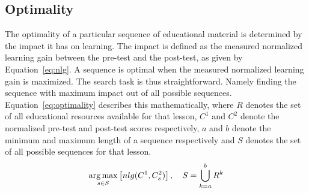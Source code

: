 \subsection{Optimality}
The optimality of a particular sequence of educational material is determined by
the impact it has on learning. The impact is defined as the measured normalized
learning gain between the pre-test and the post-test, as given by
Equation~\eqref{eq:nlg}. A sequence is optimal when the measured normalized
learning gain is maximized. The search task is thus straightforward. Namely
finding the sequence with maximum impact out of all possible sequences.
Equation~\eqref{eq:optimality} describes this mathematically, where $R$
denotes the set of all educational resources available for that lesson, $C^1$
and $C^2$ denote the normalized pre-test and post-test scores respectively, $a$
and $b$ denote the minimum and maximum length of a sequence respectively and
$S$ denotes the set of all possible sequences for that lesson.
\begin{equation}
	\label{eq:optimality}
	\operatorname*{arg\,max}_{s \in S} \left[ nlg(C^1, C^2_s) \right],
	\quad S = \bigcup_{k = a}^{b} R^k
\end{equation}
